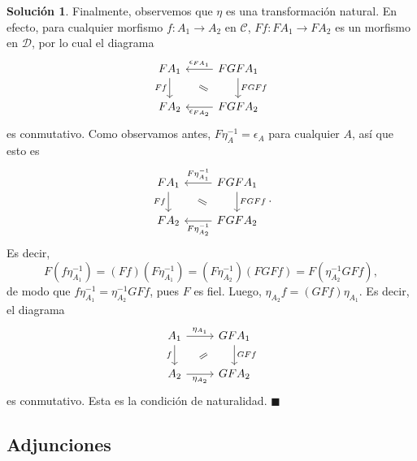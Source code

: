 \documentclass[12pt,letterpaper,titlepage]{article}
\newcommand{\xqed}[1]{%
  \leavevmode\unskip\penalty9999 \hbox{}\nobreak\hfill
  \quad\hbox{\ensuremath{#1}}}
\theoremstyle{definition}
\newtheorem*{soltemp}{Solución}
\newenvironment{sol}[1]{%
    \begin{soltemp}#1}{%
    \xqed{\blacksquare}\end{soltemp}%
}
\renewcommand\cal[1]{\mathcal{#1}}
\newcommand\com[2]{\ar[equal,from={#1},to={#2},shorten=5mm]}
\newcommand\<{\langle}
\renewcommand\>{\rangle}
\begin{document}
\begin{sol}
    Finalmente, observemos que $\eta$ es una transformación natural.
    En efecto, para cualquier morfismo $f:A_1\to A_2$ en $\cal C$,
    $Ff:FA_1\to FA_2$ es un morfismo en $\cal D$, por lo cual el diagrama
    \[
        \begin{tikzcd}
            FA_1 \ar[d,"Ff"']
            & FGFA_1 \ar[l,"\epsilon_{FA_1}"'] \ar[d,"FGFf"] \\
            FA_2 & FGFA_2 \ar[l,"\epsilon_{FA_2}"]
            \com{1-1}{2-2}
        \end{tikzcd}
    \]
    es conmutativo.
    Como observamos antes, $F\eta_A^{-1}=\epsilon_A$ para cualquier $A$, así
    que esto es
    \[
        \begin{tikzcd}
            FA_1 \ar[d,"Ff"']
            & FGFA_1 \ar[l,"F\eta_{A_1}^{-1}"'] \ar[d,"FGFf"] \\
            FA_2 & FGFA_2 \ar[l,"F\eta_{A_2}^{-1}"]
            \com{1-1}{2-2}
        \end{tikzcd}
    .\]
    Es decir,
    \[
        F(f\eta_{A_1}^{-1})
        =(Ff)(F\eta_{A_1}^{-1})
        =(F\eta_{A_2}^{-1})(FGFf)
        =F(\eta_{A_2}^{-1}GFf)
    ,\]
    de modo que $f\eta_{A_1}^{-1}=\eta_{A_2}^{-1}GFf$, pues $F$ es fiel.
    Luego, $\eta_{A_2}f=(GFf)\eta_{A_1}$.
    Es decir, el diagrama
    \[
        \begin{tikzcd}
            A_1 \ar[d,"f"'] \ar[r,"\eta_{A_1}"]
            & GFA_1 \ar[d,"GFf"] \\
            A_2 \ar[r,"\eta_{A_2}"'] & GFA_2
            \com{1-2}{2-1}
        \end{tikzcd}
    \]
    es conmutativo.
    Esta es la condición de naturalidad.
\end{sol}

\subsection{Adjunciones}
\end{document}
